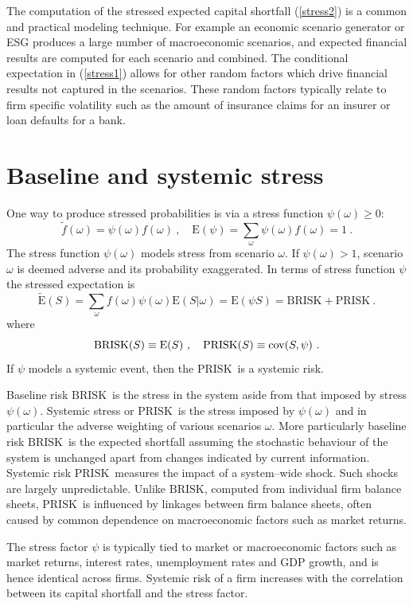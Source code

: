 \documentclass[authoryear]{elsarticle}
\newcommand{\cov}{{\rm cov}}
\newcommand{\E}{{\mathrm E}}
\newcommand{\cq}{\ ,\quad }
\newcommand{\eref}[1]{(\ref{#1})}
\newcommand{\br}{\ensuremath{\mathrm{BRISK}}}
\newcommand{\pr}{\ensuremath{\mathrm{PRISK}}}
\begin{document}
The computation of the stressed expected capital shortfall  \eref{stress2} is a common and practical modeling technique.  For example an economic scenario generator or ESG produces a large number of macroeconomic scenarios, and expected financial results are computed for each scenario and combined. The conditional expectation in \eref{stress1} allows for other random factors which drive financial results not captured in the scenarios. These random factors typically relate to firm specific volatility such as the amount of insurance claims for an insurer or loan defaults for a bank.



\section{Baseline and systemic stress}\label{s_sfactor}

One way to produce stressed probabilities is via a stress function $\psi(\omega)\ge 0$:
$$
\tilde f(\omega) = \psi(\omega) f(\omega)\cq \E(\psi) =\sum_\omega \psi(\omega)f(\omega) =  1\ .
$$
The stress function  $\psi(\omega)$ models stress from scenario $\omega$. If $\psi(\omega)>1$, scenario $\omega$ is deemed adverse and its probability exaggerated.  In terms of  stress function $\psi$ the stressed expectation is
\begin{equation}\label{stress3}
\widetilde \E(S) = \sum_\omega f(\omega) \psi(\omega) \E(S|\omega) = \E(\psi S) = \br+\pr\ .
\end{equation}
where
$$
\br(S)\equiv\E(S)\cq \pr(S) \equiv\cov(S,\psi)\ .
$$
   If $\psi$ models a systemic event, then the \pr\  is a systemic risk.


Baseline risk \br\ is the stress in the system aside from that imposed by stress $\psi(\omega)$.  Systemic stress or \pr\  is the stress imposed by $\psi(\omega)$ and in particular the adverse weighting  of various scenarios $\omega$.
More particularly baseline risk \br\  is the expected shortfall assuming the stochastic behaviour of the system is unchanged apart from changes indicated by current information. Systemic risk \pr\  measures the impact of a system--wide shock.  Such shocks are largely unpredictable. Unlike \br, computed from individual firm balance sheets, \pr\  is influenced by linkages between firm balance sheets, often caused by common dependence on macroeconomic factors such as market returns.

The stress factor $\psi$ is typically  tied to market or macroeconomic factors such as market returns, interest rates, unemployment rates and GDP growth, and is hence identical across firms. Systemic risk of a firm increases with the correlation between its capital shortfall and the stress factor.
\end{document}
